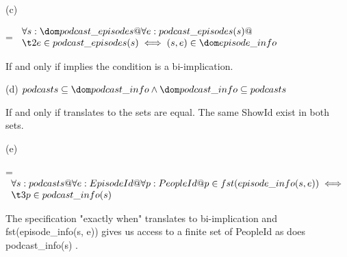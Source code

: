 \documentclass[a4paper,10pt,fleqn]{article}
\begin{document}
\bigskip

\setlength{\leftskip}{0pt}
\medskip

\noindent\hspace*{\parindent}(c)

\setlength{\leftskip}{\dimexpr\parindent+2em\relax}
\savedleftskip=\leftskip
\noindent
$\displaystyle
\begin{array}{l}
\forall s : \dom podcast\_episodes @ \forall e : podcast\_episodes(s) @ \\
\t2 e \in podcast\_episodes(s) \iff (s, e) \in \dom episode\_info
\end{array}$

\bigskip


\bigskip

\setlength{\leftskip}{\dimexpr\parindent+2em\relax}
\noindent If and only if implies the condition is a bi-implication.

\bigskip

\newpage

\setlength{\leftskip}{0pt}
\medskip

\noindent\hspace*{\parindent}(d) $podcasts \subseteq \dom podcast\_info \land \dom podcast\_info \subseteq podcasts$

\bigskip

\setlength{\leftskip}{\dimexpr\parindent+2em\relax}
\noindent If and only if translates to the sets are equal. The same ShowId exist in both sets.

\bigskip

\setlength{\leftskip}{0pt}
\medskip

\noindent\hspace*{\parindent}(e)

\setlength{\leftskip}{\dimexpr\parindent+2em\relax}
\savedleftskip=\leftskip
\noindent
$\displaystyle
\begin{array}{l}
\forall s : podcasts @ \forall e : EpisodeId @ \forall p : PeopleId @ p \in fst(episode\_info(s, e)) \iff \\
\t3 p \in podcast\_info(s)
\end{array}$

\bigskip


\bigskip

\setlength{\leftskip}{\dimexpr\parindent+2em\relax}
\noindent The specification "exactly when" translates to bi-implication and fst(episode\_info(s, e)) gives us access to a finite set of PeopleId as does podcast\_info(s) .

\bigskip
\end{document}
